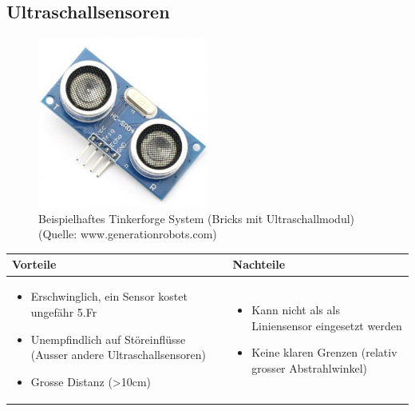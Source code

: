\pagebreak


\subsection{Ultraschallsensoren}
\begin{figure}[h]
	\centering
	\includegraphics[width=0.5\textwidth]{fig/ultraschallsensor.png}
	\caption{Beispielhaftes Tinkerforge System (Bricks mit Ultraschallmodul) (Quelle: www.generationrobots.com)}
\end{figure}

\begin{table}[h]
\begin{tabular}{p{} | p{}}


\textbf{Vorteile} & \textbf{Nachteile} \\ \hline
	 
\begin{itemize}
\item Erschwinglich, ein Sensor kostet ungefähr 5.Fr
\item Unempfindlich auf Störeinflüsse (Ausser andere Ultraschallsensoren)
\item Grosse Distanz (>10cm)
\end{itemize}
 &
\begin{itemize}
\item Kann nicht als als Liniensensor eingesetzt werden
\item Keine klaren Grenzen (relativ grosser Abstrahlwinkel)
\end{itemize}
\end{tabular}
\end{table}


